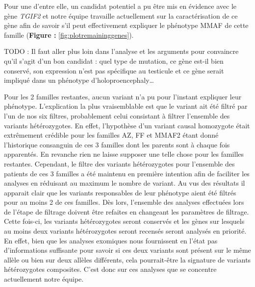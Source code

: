 \documentclass[12pt,twoside]{reedthesis}
\theoremstyle{definition}
\theoremstyle{definition}
\theoremstyle{remark}
\begin{document}
  Pour une d'entre elle, un candidat potentiel a pu être mis en évidence
  avec le gène \emph{TGIF2} et notre équipe travaille actuellement sur la
  caractérisation de ce gène afin de savoir s'il peut effectivement
  expliquer le phénotype MMAF de cette famille (\textbf{Figure :
  }\ref{fig:plotremaininggenes}).
  
  TODO : Il faut aller plus loin dans l'analyse et les arguments pour
  convaincre qu'il s'agit d'un bon candidat : quel type de mutation, ce
  gène est-il bien conservé, son expression n'est pas spécifique au
  testicule et ce gène serait impliqué dans un phénotype
  d'holoproencephaly\ldots{}
  
  Pour les 2 familles restantes, aucun variant n'a pu pour l'instant
  expliquer leur phénotype. L'explication la plus vraisemblable est que le
  variant ait été filtré par l'un de nos six filtres, probablement celui
  consistant à filtrer l'ensemble des variants hétérozygotes. En effet,
  l'hypothèse d'un variant causal homozygote était extrêmement crédible
  pour les familles AZ, FF et MMAF2 étant donné l'historique consanguin de
  ces 3 familles dont les parents sont à chaque fois apparentés. En
  revanche rien ne laisse supposer une telle chose pour les familles
  restantes. Cependant, le filtre des variants hétérozygotes pour
  l'ensemble des patients de ces 3 familles a été maintenu en première
  intention afin de faciliter les analyses en réduisant au maximum le
  nombre de variant. Au vus des résultats il apparait clair que les
  variants responsables de leur phénotype aient été filtrés pour au moins
  2 de ces familles. Dès lors, l'ensemble des analyses effectuées lors de
  l'étape de filtrage doivent être refaites en changeant les paramètres de
  filtrage. Cette fois-ci, les variants hétérozygotes seront conservés et
  les gènes sur lesquels au moins deux variants hétérozygotes seront
  recensés seront analysés en priorité. En effet, bien que les analyses
  exomiques nous fournissent en l'état pas d'informations suffisante pour
  savoir si ces deux variants sont présent sur le même allèle ou bien sur
  deux allèles différents, cela pourrait-être la signature de variants
  hétérozygotes composites. C'est donc sur ces analyses que se concentre
  actuellement notre équipe.
  
\end{document}
